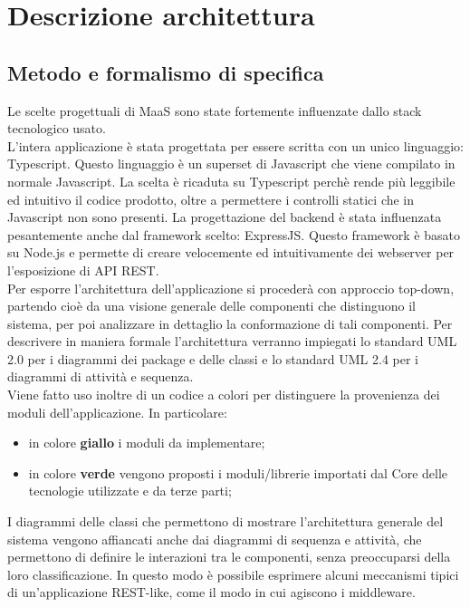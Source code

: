 \newpage
\section{Descrizione architettura}
\subsection{Metodo e formalismo di specifica}
Le scelte progettuali di MaaS sono state fortemente influenzate dallo stack tecnologico usato. \\
L'intera applicazione è stata progettata per essere scritta con un unico linguaggio: Typescript. Questo linguaggio è un superset di Javascript che viene compilato in normale Javascript. La scelta è ricaduta su Typescript perchè rende più leggibile ed intuitivo il codice prodotto, oltre a permettere i controlli statici che in Javascript non sono presenti.
La progettazione del backend è stata influenzata pesantemente anche dal framework scelto: ExpressJS. Questo framework è basato su Node.js e permette di creare velocemente ed intuitivamente dei webserver per l'esposizione di API REST. \\
Per esporre l'architettura dell'applicazione si procederà con approccio top-down, partendo cioè da una visione generale delle componenti che distinguono il sistema, per poi analizzare in dettaglio la conformazione di tali componenti. Per descrivere in maniera formale l'architettura verranno impiegati lo standard UML 2.0 per i diagrammi dei package e delle classi e lo standard UML 2.4 per i diagrammi di attività e sequenza. \\

Viene fatto uso inoltre di un codice a colori per distinguere la provenienza dei moduli dell'applicazione. In particolare:
\begin{itemize}
\item in colore \textbf{giallo} i moduli da implementare;
\item in colore \textbf{verde} vengono proposti i moduli/librerie importati dal Core delle tecnologie utilizzate e da terze parti;
\end{itemize}

I diagrammi delle classi che permettono di mostrare l'architettura generale del sistema vengono affiancati anche dai diagrammi di sequenza e attività, che permettono di definire le interazioni tra le componenti, senza preoccuparsi della loro classificazione. In questo modo è possibile esprimere alcuni meccanismi tipici di un'applicazione REST-like, come il modo in cui agiscono i middleware. 

